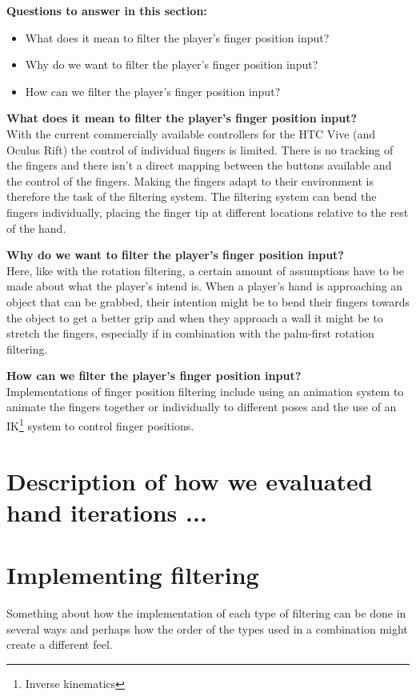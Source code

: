 \textbf{Questions to answer in this section:}
\begin{itemize}
\item What does it mean to filter the player's finger position input?
\item Why do we want to filter the player's finger position input?
\item How can we filter the player's finger position input?
\end{itemize}

\textbf{What does it mean to filter the player's finger position input?}\\
With the current commercially available controllers for the HTC Vive (and Oculus Rift) the control of individual fingers is limited. There is no tracking of the fingers and there isn't a direct mapping between the buttons available and the control of the fingers. Making the fingers adapt to their environment is therefore the task of the filtering system. The filtering system can bend the fingers individually, placing the finger tip at different locations relative to the rest of the hand.

\textbf{Why do we want to filter the player's finger position input?}\\
Here, like with the rotation filtering, a certain amount of assumptions have to be made about what the player's intend is. When a player's hand is approaching an object that can be grabbed, their intention might be to bend their fingers towards the object to get a better grip and when they approach a wall it might be to stretch the fingers, especially if in combination with the palm-first rotation filtering.

\textbf{How can we filter the player's finger position input?}\\
Implementations of finger position filtering include using an animation system to animate the fingers together or individually to different poses and the use of an IK\footnote{Inverse kinematics} system to control finger positions.



\section{Description of how we evaluated hand iterations ...}
\label{sec:DESCRIPTIONOFEVALUATIONSCENARIOS}

\section{Implementing filtering}
\label{sec:implementingFiltering}
Something about how the implementation of each type of filtering can be done in several ways and perhaps how the order of the types used in a combination might create a different feel.

